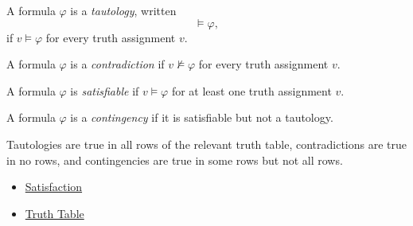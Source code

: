 \begin{tcolorbox}[colback=propbox, colframe=propborder, arc=2pt,
  left=6pt, right=6pt, top=4pt, bottom=4pt,
  title={\small\textbf{Definition (Tautology)}},
  fonttitle=\small\bfseries]
\label{def:tautology-propositional-logic}
A formula $\varphi$ is a \emph{tautology}, written
\[
\models\varphi,
\]
if $v\models\varphi$ for every truth assignment $v$.
\end{tcolorbox}

\begin{tcolorbox}[colback=propbox, colframe=propborder, arc=2pt,
  left=6pt, right=6pt, top=4pt, bottom=4pt,
  title={\small\textbf{Definition (Contradiction)}},
  fonttitle=\small\bfseries]
\label{def:contradiction-propositional-logic}
A formula $\varphi$ is a \emph{contradiction} if $v\not\models\varphi$ for
every truth assignment $v$.
\end{tcolorbox}

\begin{tcolorbox}[colback=propbox, colframe=propborder, arc=2pt,
  left=6pt, right=6pt, top=4pt, bottom=4pt,
  title={\small\textbf{Definition (Satisfiable Formula)}},
  fonttitle=\small\bfseries]
\label{def:satisfiable-formula-propositional-logic}
A formula $\varphi$ is \emph{satisfiable} if $v\models\varphi$ for at least one
truth assignment $v$.
\end{tcolorbox}

\begin{tcolorbox}[colback=propbox, colframe=propborder, arc=2pt,
  left=6pt, right=6pt, top=4pt, bottom=4pt,
  title={\small\textbf{Definition (Contingency)}},
  fonttitle=\small\bfseries]
\label{def:contingency-propositional-logic}
A formula $\varphi$ is a \emph{contingency} if it is satisfiable but not a
tautology.
\end{tcolorbox}

\begin{remark*}[Interpretation]
Tautologies are true in all rows of the relevant truth table, contradictions
are true in no rows, and contingencies are true in some rows but not all rows.
\end{remark*}

\begin{dependencies}
\begin{itemize}
  \item \hyperref[def:satisfaction-propositional-logic]{Satisfaction}
  \item \hyperref[def:truth-table-propositional-logic]{Truth Table}
\end{itemize}
\end{dependencies}
